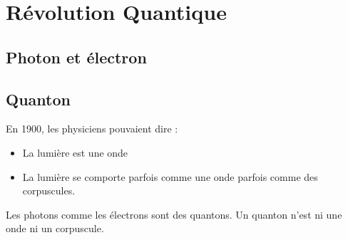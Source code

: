\section{Révolution Quantique}
\subsection{Photon et électron}



\subsection{Quanton}



En 1900, les physiciens pouvaient dire : 

\begin{itemize}[leftmargin=1cm, label=, itemsep=3pt]
\item La lumière est une onde
\item La lumière se comporte parfois comme une onde parfois comme des corpuscules.
\end{itemize}




Les photons comme les électrons sont des quantons. Un quanton n'est ni une onde ni un corpuscule.

\subsection{}\subsection{}
\begin{center}
\end{center}

